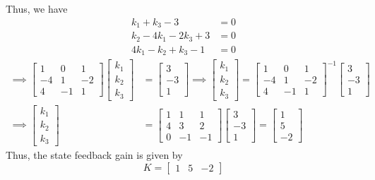 Thus, we have
\begin{align*}
    k_1 + k_3 - 3         & = 0 \\
    k_2 - 4k_1 - 2k_3 + 3 & = 0 \\
    4k_1 - k_2 + k_3 - 1  & = 0
\end{align*}
\begin{align*}
    \implies
    \begin{bmatrix}
        1  & 0  & 1  \\
        -4 & 1  & -2 \\
        4  & -1 & 1
    \end{bmatrix}
    \begin{bmatrix}
        k_1 \\
        k_2 \\
        k_3
    \end{bmatrix}
     & =
    \begin{bmatrix}
        3  \\
        -3 \\
        1
    \end{bmatrix}
    \implies
    \begin{bmatrix}
        k_1 \\
        k_2 \\
        k_3
    \end{bmatrix}
    =
    \begin{bmatrix}
        1  & 0  & 1  \\
        -4 & 1  & -2 \\
        4  & -1 & 1
    \end{bmatrix}^{-1}
    \begin{bmatrix}
        3  \\
        -3 \\
        1
    \end{bmatrix}
    \\
    \implies
    \begin{bmatrix}
        k_1 \\
        k_2 \\
        k_3
    \end{bmatrix}
     & =
    \begin{bmatrix}
        1 & 1  & 1  \\
        4 & 3  & 2  \\
        0 & -1 & -1
    \end{bmatrix}
    \begin{bmatrix}
        3  \\
        -3 \\
        1
    \end{bmatrix}
    =
    \begin{bmatrix}
        1 \\
        5 \\
        -2
    \end{bmatrix}
\end{align*}
Thus, the state feedback gain is given by
\begin{equation*}
    \boxed{
        K
        =
        \begin{bmatrix}
            1 & 5 & -2
        \end{bmatrix}
    }
\end{equation*}
